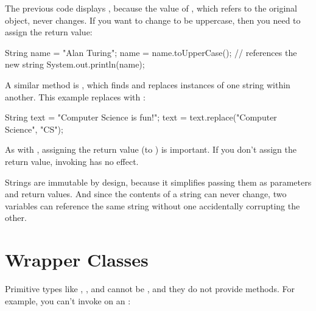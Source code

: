 The previous code displays , because the value of , which refers to the original  object, never changes.
If you want to change  to be uppercase, then you need to assign the return value:

\begin{code}
String name = "Alan Turing";
name = name.toUpperCase();    // references the new string
System.out.println(name);
\end{code}


A similar method is , which finds and replaces instances of one string within another.
This example replaces  with :

\begin{code}
String text = "Computer Science is fun!";
text = text.replace("Computer Science", "CS");
\end{code}


As with , assigning the return value (to ) is important.
If you don't assign the return value, invoking  has no effect.


Strings are immutable by design, because it simplifies passing them as parameters and return values.
And since the contents of a string can never change, two variables can reference the same string without one accidentally corrupting the other.


\section{Wrapper Classes}

Primitive types like , , and  cannot be , and they do not provide methods.
For example, you can't invoke  on an :

